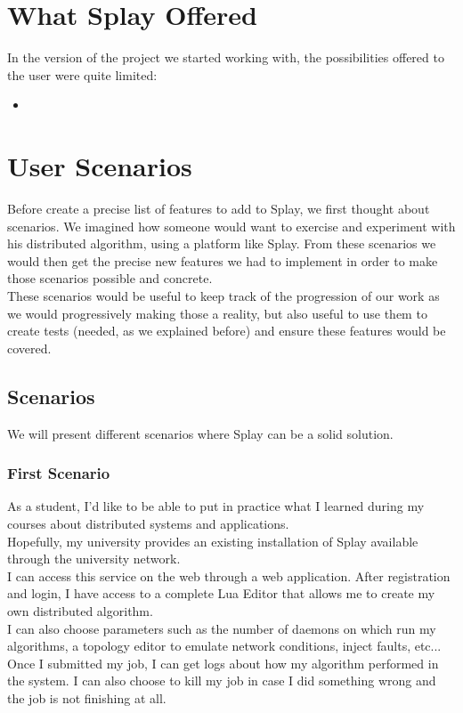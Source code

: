 \documentclass{eplmastersthesis}
\begin{document}
    \section{What Splay Offered} %

      In the version of the project we started working with, the possibilities
      offered to the user were quite limited:

      \begin{itemize}
        \item
      \end{itemize}

    \section{User Scenarios}

      Before create a precise list of features to add to Splay, we first
      thought about scenarios. We imagined how someone would want to exercise
      and experiment with his distributed algorithm, using a platform like
      Splay. From these scenarios we would then get the precise new features
      we had to implement in order to make those scenarios possible and
      concrete.\\

      These scenarios would be useful to keep track of the progression of our
      work as we would progressively making those a reality, but also useful
      to use them to create tests (needed, as we explained before) and ensure
      these features would be covered.

      \subsection{Scenarios}

        We will present different scenarios where Splay can be a solid solution.

        \subsubsection{First Scenario}

          As a student, I'd like to be able to put in practice what I learned
          during my courses about distributed systems and applications.\\
          Hopefully, my university provides an existing installation of Splay
          available through the university network.\\
          I can access this service on the web through a web application. After
          registration and login, I have access to a complete Lua Editor that
          allows me to create my own distributed algorithm.\\
          I can also choose parameters such as the number of daemons on
          which run my algorithms, a topology editor to emulate network
          conditions, inject faults, etc...\\
          Once I submitted my job, I can get logs about how my algorithm
          performed in the system. I can also choose to kill my job in case
          I did something wrong and the job is not finishing at all.
\end{document}
